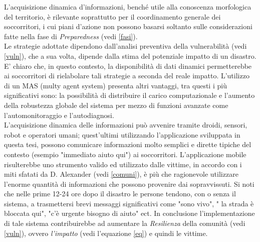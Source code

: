 \newpage
L'acquisizione dinamica d'informazioni, benché utile alla conoscenza morfologica del territorio, è rilevante soprattutto per il coordinamento generale dei soccorritori, i cui piani d'azione non possono basarsi soltanto sulle considerazioni fatte nella fase di \textit{Preparedness} (vedi \ref{fasi}).\\
 Le strategie adottate dipendono dall'analisi preventiva della vulnerabilità (vedi \ref{vuln}), che a sua volta, dipende dalla stima del potenziale impatto di un disastro.\\
 E' chiaro che, in questo contesto, la disponibilità di dati dinamici permetterebbe ai soccorritori di rielabolare tali strategie a seconda del reale impatto. 
L'utilizzo di un MAS (multy agent system) presenta altri vantaggi, tra questi i più significativi sono: la possibilità di distribuire il carico computazionale e l'aumento della robustezza globale del sistema per mezzo di funzioni avanzate come l'automonitoraggio e l'autodiagnosi.\\
L'acquisizione dinamica delle informazioni può avvenire tramite droidi, sensori, robot e operatori umani; quest'ultimi utilizzando l'applicazione sviluppata in questa tesi, possono comunicare informazioni molto semplici e dirette tipiche del contesto (esempio "immediato aiuto qui") ai soccorritori. L'applicazione mobile risulterebbe uno strumento valido ed utilizzato dalle vittime, in accordo con i miti sfatati da D. Alexander (vedi \ref{comuni}), è più che ragionevole utilizzare l'enorme quantità di informazioni che possono provenire dai sopravvissuti. Si noti che nelle prime 12-24 ore dopo il disastro le persone tendono, con o senza il sistema, a trasmettersi brevi messaggi significativi come "sono vivo", " la strada è bloccata qui", "c'è urgente bisogno di aiuto" ect. In conclusione l'implementazione di tale sistema contribuirebbe ad aumentare la \textit{Resilienza} della comunità (vedi \ref{vuln}), ovvero \textit{l'impatto} (vedi l'equazione \ref{eq}) e quindi le vittime. 
